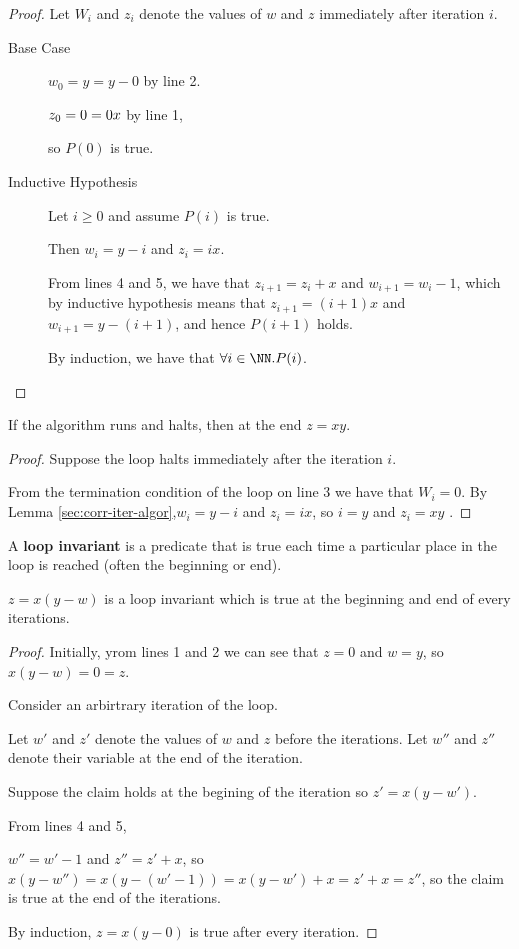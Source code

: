 \documentclass[11pt]{scrartcl}
\begin{document}
\begin{proof}
  \hfill

Let $W_i$ and $z_i$ denote the values of $w$ and $z$ immediately after iteration $i$.

\begin{description}
\item[Base Case] \hfill

$w_0 = y =y-0$ by line 2.

$z_0 = 0 = 0\* x$ by line 1,

so $P(0)$ is true.

\item[Inductive Hypothesis] \hfill

Let $i\geq 0$ and assume $P(i)$ is true.

Then $w_i = y-i$ and $z_i = ix$.

From lines 4 and 5, we have that $z_{i+1}=z_i+x$ and $w_{i+1}=w_i-1$,
which by inductive hypothesis means that $z_{i+1}=(i+1) x$ and
$w_{i+1}= y-(i+1)$, and hence $P(i+1)$ holds.

By induction, we have that $\forall i\in\NN.P(i)$.
\end{description}
\end{proof}
\begin{corollary}
If the algorithm runs and halts, then at the end $z = xy$.
\end{corollary}
\begin{proof}
  \hfill

Suppose the loop halts immediately after the iteration $i$.

From the termination condition of the loop on line 3 we have that
$W_i= 0 $. By Lemma \ref{sec:corr-iter-algor},$w_i = y-i$ and
$z_i = ix$, so $i=y$ and $z_{i} = xy$ .
\end{proof}

A \textbf{loop invariant} is a predicate that is true each time a
particular place in the loop is reached (often the beginning or end).

\begin{lemma}
  $z = x(y-w)$ is a loop invariant which is true at the beginning and
  end of every iterations.
\end{lemma}

\begin{proof}
  \hfill

  Initially, yrom lines 1 and 2 we can see that $z = 0$ and $w =y$, so
  $x(y-w) = 0=z$.

  Consider an arbirtrary iteration of the loop.

  Let $w'$ and $z'$ denote the values of $w$ and $z$ before the
  iterations. Let $w''$ and $z''$ denote their variable at the end of the iteration. 

  Suppose the claim holds at the begining of the iteration so
  $z'=x(y-w')$.

  From lines 4 and 5, 

  $w'' =w' - 1$ and $z''=z'+x$, so
  $x(y-w'') = x(y-(w'-1)) = x(y-w') +x = z'+x = z''$, so the claim is
  true at the end of the iterations.

  By induction, $z = x(y-0)$ is true after every iteration.
\end{proof}
\end{document}
